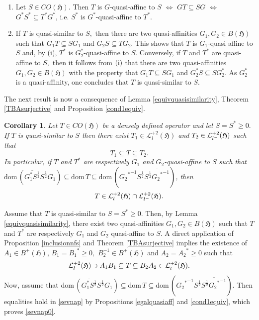 \documentclass{amsart}
\makeatletter
\newtheorem{corollary}[theorem]{Corollary}
\newcommand{\ifaf}{\Leftrightarrow}
\newcommand{\h}{\mathfrak{H}}
\newcommand{\D}{\mathrm{dom}\,}
\newcommand{\DT}{\mathrm{dom}\,T }
\newcommand{\adj}{^*}
\newcommand{\inv}{^{-1}}
\newcommand{\tstar}{T^{*}}
\newcommand{\half}{^{\frac{1}{2}}}
\newcommand{\inclu}{\subseteq}
\newcommand{\lplus}{B^{+}(\h)}
\newcommand{\ldeux}{\mathcal{L}_l^{+2}(\h)}
\newcommand{\lldeux}{\mathcal{L}_{{l}^{\tiny-}}^{+2}(\h)}
\numberwithin{equation}{section}
\renewenvironment{proof}[1][\proofname]{%
   \par\pushQED{\qed}\normalfont%
   \topsep6\p@\@plus6\p@\relax
   \trivlist\item[\hskip\labelsep\bfseries#1\@addpunct{.}]%
   \ignorespaces
}{%
   \popQED\endtrivlist\@endpefalse
}
\makeatother
\begin{document}
\begin{proof}
\begin{enumerate}[\rm(i)]
\item Let $S \in CO(\h).$ Then $T$ is $G$-quasi-affine to $S$ $\ifaf$ $G T \inclu SG $ $\ifaf $ $ G\adj S\adj \inclu \tstar G\adj$, i.e. $S\adj$ is $G\adj$-quasi-affine to $\tstar.$
\item   If $T$ is   quasi-similar to $S,$ then there are two quasi-affinities $G_1 , G_2 \in B(\h)$
      such that $ G_1T \inclu SG_1$ and $G_2S  \inclu   TG_2.$ This shows that $T$ is $G_1$-quasi affine to $S$ and, by (i), $\tstar$ is $G_2\adj$-quasi-affine to $S.$
Conversely, if   $T$ and $\tstar$ are quasi-affine to $S,$  then it follows from $\rm{(i)}$ that there are   two
      quasi-affinities $G_1,G_2 \in B(\h)$ with the property that $G_1T \inclu SG_1$
      and $G_2\adj S    \inclu S G_2\adj.$   As $G_2\adj$ is a quasi-affinity, one concludes that $T$ is
      quasi-similar to $S.$
\end{enumerate}
\end{proof}

The next result is now a consequence of Lemma \ref{equivquasisimilarity}, Theorem \ref{TBAsurjective} and Proposition \ref{cond1equiv}.

 \begin{corollary}
Let $T \in CO(\h)$ be a densely defined operator and let $S =S\adj \geq 0.$ If
$ T$ is quasi-similar to $S$
     then  there exist $T_1 \in \ldeux$ and $T_2 \in \lldeux$ such that
   $$
   T_1 \inclu T \inclu T_2.
   $$
   In particular, if
$ T$ and $\tstar$ are respectively     $G_1$ and $G_2$-quasi-affine to $S$  such that
  $\D ( \overline{G_1\adj S\half}  S\half G_1) \inclu \DT \inclu \D (    {{G_2}\adj}\inv S\half \overline{S\half {{G_2}\adj}\inv})$, then
  \begin{equation}\label{sevnap0}
    T \in \ldeux \cap \lldeux.
  \end{equation}
 \end{corollary}

\begin{proof} Assume that $T$ is quasi-similar to $S=S\adj \geq 0.$ Then, by   Lemma \ref{equivquasisimilarity}, there exist two quasi-affinities  $G_1, G_2 \in B(\h)$ such that
  $T$   and $\tstar$  are respectively $G_1$ and $G_2$ quasi-affine to  $S.$ A direct application of  Proposition  \ref{inclusionnfs} and Theorem \ref{TBAsurjective} implies the existence of $A_1\in \lplus$, $B_1={B_1}\adj \geq 0,$  $B_2\inv \in \lplus$ and  $A_2 ={A_2}\adj \geq 0$ such that
 \begin{equation}\label{sevnap}
   \ldeux \ni  A_1 B_1 \inclu T \inclu B_2 A_2   \in \lldeux.
 \end{equation}
%
Now, assume   that  $\D ( \overline{G_1\adj S\half}  S\half G_1) \inclu \DT \inclu \D (    {{G_2}\adj}\inv S\half  \overline{S\half {{G_2}\adj}\inv})$.
Then equalities hold in \eqref{sevnap} by Propositions \ref{egalquasiaff} and \ref{cond1equiv}, which proves \eqref{sevnap0}.
\end{proof}
\end{document}

